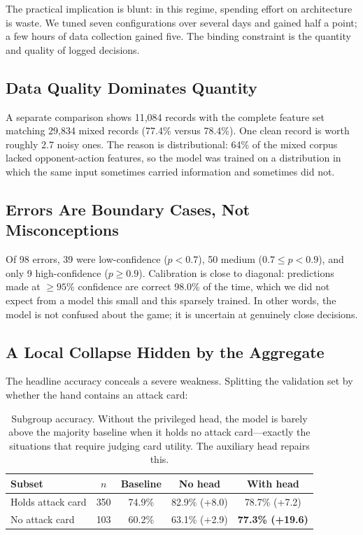 \documentclass[11pt]{article}
\begin{document}
The practical implication is blunt: in this regime, spending effort on architecture is waste. We tuned seven configurations over several days and gained half a point; a few hours of data collection gained five. The binding constraint is the quantity and quality of logged decisions.

\subsection{Data Quality Dominates Quantity}

A separate comparison shows 11,084 records with the complete feature set matching 29,834 mixed records (77.4\% versus 78.4\%). One clean record is worth roughly 2.7 noisy ones. The reason is distributional: 64\% of the mixed corpus lacked opponent-action features, so the model was trained on a distribution in which the same input sometimes carried information and sometimes did not.

\subsection{Errors Are Boundary Cases, Not Misconceptions}

Of 98 errors, 39 were low-confidence ($p<0.7$), 50 medium ($0.7\le p<0.9$), and only 9 high-confidence ($p\ge 0.9$). Calibration is close to diagonal: predictions made at $\ge 95\%$ confidence are correct 98.0\% of the time, which we did not expect from a model this small and this sparsely trained. In other words, the model is not confused about the game; it is uncertain at genuinely close decisions.

\subsection{A Local Collapse Hidden by the Aggregate}

The headline accuracy conceals a severe weakness. Splitting the validation set by whether the hand contains an attack card:

\begin{table}[t]
\centering
\small
\begin{tabular}{@{}lcccc@{}}
\toprule
\textbf{Subset} & \textbf{$n$} & \textbf{Baseline} & \textbf{No head} & \textbf{With head} \\
\midrule
Holds attack card & 350 & 74.9\% & 82.9\% (+8.0) & 78.7\% (+7.2) \\
No attack card & 103 & 60.2\% & 63.1\% (+2.9) & \textbf{77.3\% (+19.6)} \\
\bottomrule
\end{tabular}
\caption{Subgroup accuracy. Without the privileged head, the model is barely above the majority baseline when it holds no attack card---exactly the situations that require judging card utility. The auxiliary head repairs this.}
\label{tab:subgroup}
\end{table}
\end{document}
